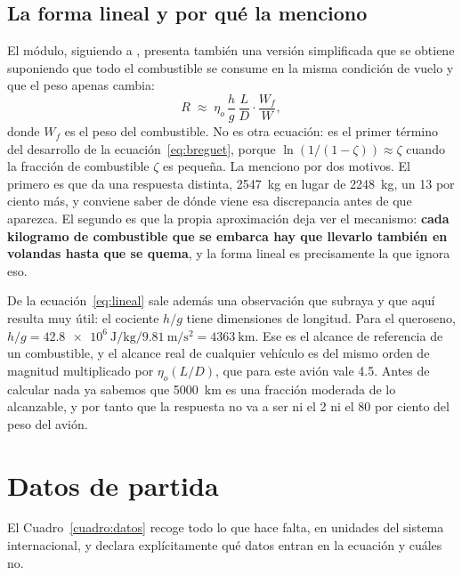 \documentclass[11pt,letterpaper]{article}
\begin{document}
\subsection{La forma lineal y por qué la menciono}

El módulo, siguiendo a \textcite{tennekes2009}, presenta también una versión
simplificada que se obtiene suponiendo que todo el combustible se consume en la
misma condición de vuelo y que el peso apenas cambia:
\begin{equation}
R \;\approx\; \eta_o\,\frac{h}{g}\,\frac{L}{D}\cdot\frac{W_f}{W},
\label{eq:lineal}
\end{equation}
donde \(W_f\) es el peso del combustible. No es otra ecuación: es el primer
término del desarrollo de la ecuación~\eqref{eq:breguet}, porque
\(\ln(1/(1-\zeta)) \approx \zeta\) cuando la fracción de combustible \(\zeta\)
es pequeña. La menciono por dos motivos. El primero es que da una respuesta
distinta, \SI{2547}{\kilogram} en lugar de \SI{2248}{\kilogram}, un 13 por
ciento más, y conviene saber de dónde viene esa discrepancia antes de que
aparezca. El segundo es que la propia aproximación deja ver el mecanismo:
\textbf{cada kilogramo de combustible que se embarca hay que llevarlo también
en volandas hasta que se quema}, y la forma lineal es precisamente la que
ignora eso.

De la ecuación~\eqref{eq:lineal} sale además una observación que
\textcite{tennekes2009} subraya y que aquí resulta muy útil: el cociente
\(h/g\) tiene dimensiones de longitud. Para el queroseno,
\(h/g = \SI{42.8e6}{\joule\per\kilogram} / \SI{9.81}{\meter\per\second\squared}
= \SI{4363}{\kilo\meter}\). Ese es el alcance de referencia de un combustible,
y el alcance real de cualquier vehículo es del mismo orden de magnitud
multiplicado por \(\eta_o (L/D)\), que para este avión vale \num{4.5}. Antes de
calcular nada ya sabemos que \SI{5000}{\kilo\meter} es una fracción moderada de
lo alcanzable, y por tanto que la respuesta no va a ser ni el 2 ni el 80 por
ciento del peso del avión.

\section{Datos de partida}

El Cuadro~\ref{cuadro:datos} recoge todo lo que hace falta, en unidades del
sistema internacional, y declara explícitamente qué datos entran en la ecuación
y cuáles no.
\end{document}
